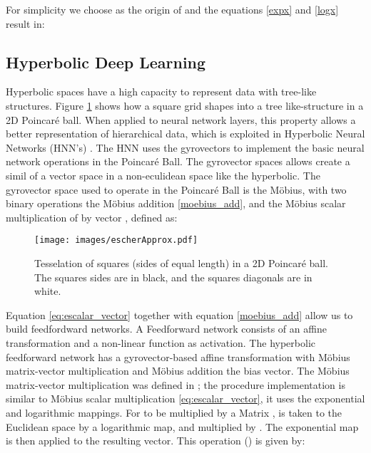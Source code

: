 \documentclass[journal]{IEEEtran}
\begin{document}
 
For simplicity we choose  as the origin of  and the equations \eqref{expx} and \eqref{logx} result in:
 
 
 
 
 
 



\subsection{Hyperbolic Deep Learning}











Hyperbolic spaces have a high capacity to represent data with tree-like structures. Figure \ref{poincare_ball} shows how a square grid shapes into a tree like-structure in a 2D Poincaré ball. When applied to neural network layers, this property allows a better representation of hierarchical data, which is exploited in Hyperbolic Neural Networks (HNN's) \cite{hnn}. The HNN uses the gyrovectors to implement the basic neural network operations in the Poincaré Ball. The gyrovector spaces allows create a simil of a vector space in a non-eculidean space like the hyperbolic. The gyrovector space used to operate in the Poincaré Ball is the Möbius, with two binary operations the Möbius addition \eqref{moebius_add}, and the Möbius scalar multiplication of  by vector , defined as:


 
 \begin{figure}[t]
\begin{center}
\texttt{[image: images/escherApprox.pdf]}
  \caption{Tesselation of squares (sides of equal length) in a 2D Poincar\'e ball. The squares sides are in black, and the squares diagonals are in white.}
  \label{poincare_ball}
\end{center}
\end{figure}

 Equation \eqref{eq:escalar_vector} together with equation \eqref{moebius_add} allow us to build feedfordward networks. 
A Feedforward network consists of an affine transformation and a non-linear function as activation. The hyperbolic feedforward network \cite{hnn}
has a gyrovector-based affine transformation with Möbius matrix-vector multiplication and Möbius addition the bias vector. The Möbius matrix-vector multiplication was defined in \cite{hnn}; the procedure implementation is similar to Möbius scalar multiplication \eqref{eq:escalar_vector}, it uses the exponential and logarithmic mappings. For  to be multiplied by a Matrix  ,  is taken to the Euclidean space by a logarithmic map, and  multiplied by . The exponential map is then applied to the resulting vector. This operation  () is given by:
\end{document}
